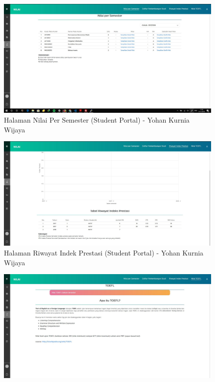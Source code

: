 \begin{itemize}
\begin{enumerate}
\begin{figure}[H]
			\includegraphics[scale=0.325]{Gambar/HasilPengujian/2017_1_nps_studentportal}
			\caption{Halaman Nilai Per Semester (Student Portal) - Yohan Kurnia Wijaya}
			\label{fig:2017_1_nps_studentportal}
		\end{figure}
		\begin{figure}[H]
			\centering
			\includegraphics[scale=0.325]{Gambar/HasilPengujian/2017_1_rip_studentportal}
			\caption{Halaman Riwayat Indek Prestasi (Student Portal) - Yohan Kurnia Wijaya}
			\label{fig:2017_1_rip_studentportal}
		\end{figure}
		\begin{figure}[H]
			\centering
			\includegraphics[scale=0.325]{Gambar/HasilPengujian/2017_1_toefl_studentportal}

\end{figure}
\end{enumerate}
\end{itemize}
